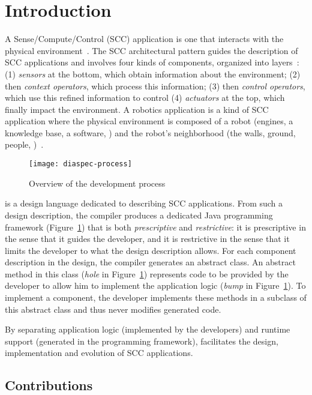 \section{Introduction}

A Sense/Compute/Control (SCC) application is one that interacts with
the physical environment~\cite{Tayl09a}. The SCC architectural pattern
guides the description of SCC applications and involves four kinds of
components, organized into layers~\cite{Cass11a,Edwar09a}: (1)
\emph{sensors} at the bottom, which obtain information about the
environment; (2) then \emph{context operators}, which process this
information; (3) then \emph{control operators}, which use this refined
information to control (4) \emph{actuators} at the top, which finally
impact the environment. A robotics application is a kind of SCC
application where the physical environment is composed of a robot
(engines, a knowledge base, a software, \etc{}) and the robot's
neighborhood (the walls, ground, people, \etc{})~\cite{Sicil08a}.

\begin{figure}
  \centering
  \texttt{[image: diaspec-process]}
  \caption{Overview of the \diaspec{} development process}
  \label{fig:diaspec-process}
\end{figure}

\diaspec{} is a design language dedicated to describing SCC
applications. From such a design description, the \diaspec{} compiler
produces a dedicated Java programming framework
(Figure~\ref{fig:diaspec-process}) that is both \emph{prescriptive}
and \emph{restrictive}: it is prescriptive in the sense that it guides
the developer, and it is restrictive in the sense that it limits the
developer to what the design description allows. For each component
description in the design, the compiler generates an abstract class.
An abstract method in this class (\emph{hole} in
Figure~\ref{fig:diaspec-process}) represents code to be provided by
the developer to allow him to implement the application logic
(\textit{bump} in Figure~\ref{fig:diaspec-process}). To implement a
component, the developer implements these methods in a subclass of
this abstract class and thus never modifies generated code.

By separating application logic (implemented by the developers) and
runtime support (generated in the programming framework), \diaspec{}
facilitates the design, implementation and evolution of SCC
applications. 

\subsection*{Contributions}

